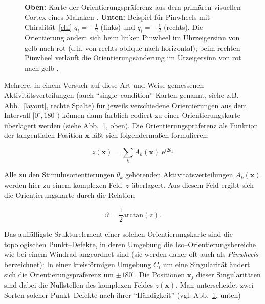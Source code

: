 \begin{figure}[t]
\centering
\begin{minipage}{10cm}
\end{minipage}
\vskip0.5cm
\begin{minipage}[b]{4cm}
\end{minipage}
\caption{\textbf{Oben:} Karte der Orientierungspräferenz aus dem primären
visuellen Cortex eines Makaken \parencite[aus][]{blasdel:1992b}.
\textbf{Unten:} Beispiel für Pinwheels mit Chiralität~\eqref{chi}
$q_i=+\frac{1}{2}$ (links) und $q_i=-\frac{1}{2}$ (rechts). Die
Orientierung ändert sich beim linken Pinwheel im Uhrzeigersinn von gelb
nach rot (d.h. von rechts oblique nach horizontal); beim rechten Pinwheel
verläuft die Orientierungsänderung im Urzeigersinn von rot nach gelb \parencite[d.h. von horizontal nach rechts oblique; aus][]{bonhoeffer:1991}.}
\label{opblasdel}
\end{figure}

Mehrere, in einem Versuch auf diese Art und Weise gemessenen
Aktivitäts\-ver\-tei\-lungen (auch ``single--condition'' Karten genannt, siehe
z.B. Abb.~\ref{layout}, rechte Spalte) für jeweils verschiedene
Orientierungen aus dem Intervall $[0^\circ,180^\circ)$ können dann
farblich codiert zu einer Orientierungskarte überlagert werden (siehe
Abb.~\ref{opblasdel}, oben).  Die Orientierungspräferenz als Funktion der
tangentialen Position $\mathbf{x}$ läßt sich folgendermaßen formulieren:

\begin{equation*}
z(\mathbf{x})=\sum\limits_k A_k(\mathbf{x})\; \text{e}^{i2\theta_k}
\label{zfeld}
\end{equation*}

Alle zu den Stimulusorientierungen $\theta_k$ gehörenden
Aktivitätsverteilungen $A_k(\mathbf{x})$ werden hier zu einem komplexen
Feld~$z$ überlagert.  Aus diesem Feld ergibt sich die Orientierungskarte
durch die Relation

\begin{equation*}
\vartheta=\frac{1}{2}\text{arctan}(z).
\end{equation*}

Das auffälligste Srukturelement einer solchen Orientierungskarte sind die
topologischen Punkt--Defekte, in deren Umgebung die
Iso--Orientierungsbereiche wie bei einem Windrad angeordnet sind (sie
werden daher oft auch als \emph{Pinwheels} berzeichnet): In einer
kreisförmigen Umgebung $C_i$ um eine Singularität ändert sich die
Orientierungspräferenz um $\pm 180^\circ$.  Die Positionen $\mathbf{x}_j$
dieser Singularitäten sind dabei die Nullstellen des komplexen Feldes
$z(\mathbf{x})$. Man unterscheidet zwei Sorten solcher Punkt--Defekte nach
ihrer ``Händigkeit'' (vgl. Abb.~\ref{opblasdel}, unten)

